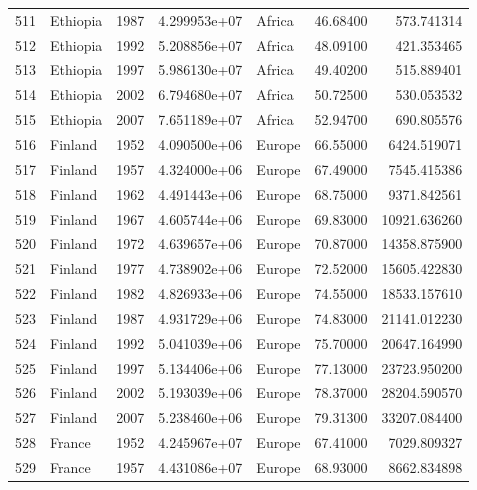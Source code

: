 \documentclass[
  letterpaper,
  DIV=11,
  numbers=noendperiod]{scrreprt}
\begin{document}
\begin{tabular}{llrrlrr}
511  &                  Ethiopia &  1987 &  4.299953e+07 &    Africa &  46.68400 &     573.741314 \\
512  &                  Ethiopia &  1992 &  5.208856e+07 &    Africa &  48.09100 &     421.353465 \\
513  &                  Ethiopia &  1997 &  5.986130e+07 &    Africa &  49.40200 &     515.889401 \\
514  &                  Ethiopia &  2002 &  6.794680e+07 &    Africa &  50.72500 &     530.053532 \\
515  &                  Ethiopia &  2007 &  7.651189e+07 &    Africa &  52.94700 &     690.805576 \\
516  &                   Finland &  1952 &  4.090500e+06 &    Europe &  66.55000 &    6424.519071 \\
517  &                   Finland &  1957 &  4.324000e+06 &    Europe &  67.49000 &    7545.415386 \\
518  &                   Finland &  1962 &  4.491443e+06 &    Europe &  68.75000 &    9371.842561 \\
519  &                   Finland &  1967 &  4.605744e+06 &    Europe &  69.83000 &   10921.636260 \\
520  &                   Finland &  1972 &  4.639657e+06 &    Europe &  70.87000 &   14358.875900 \\
521  &                   Finland &  1977 &  4.738902e+06 &    Europe &  72.52000 &   15605.422830 \\
522  &                   Finland &  1982 &  4.826933e+06 &    Europe &  74.55000 &   18533.157610 \\
523  &                   Finland &  1987 &  4.931729e+06 &    Europe &  74.83000 &   21141.012230 \\
524  &                   Finland &  1992 &  5.041039e+06 &    Europe &  75.70000 &   20647.164990 \\
525  &                   Finland &  1997 &  5.134406e+06 &    Europe &  77.13000 &   23723.950200 \\
526  &                   Finland &  2002 &  5.193039e+06 &    Europe &  78.37000 &   28204.590570 \\
527  &                   Finland &  2007 &  5.238460e+06 &    Europe &  79.31300 &   33207.084400 \\
528  &                    France &  1952 &  4.245967e+07 &    Europe &  67.41000 &    7029.809327 \\
529  &                    France &  1957 &  4.431086e+07 &    Europe &  68.93000 &    8662.834898 \\

\end{tabular}
\end{document}
